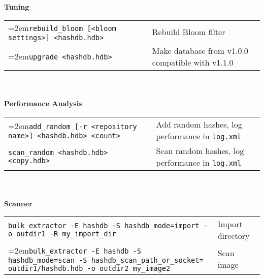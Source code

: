 \begin{small}
\begin{footnotesize}
\begin{tabular}{p{3.6 in} p{3.0 in}}
\end{tabular}
\\
\\
\textbf{Tuning}\\
\begin{tabular}{p{3.6 in} p{3.0 in}}
\hangindent=2em\texttt{rebuild\_bloom [<bloom settings>] <hashdb.hdb>} & Rebuild Bloom filter \\
\hangindent=2em\texttt{upgrade <hashdb.hdb>} & Make database from v1.0.0 compatible with v1.1.0\\
\end{tabular}
\\
\\
\textbf{Performance Analysis}\\
\begin{tabular}{p{3.6 in} p{4 in}}
\hangindent=2em\texttt{add\_random [-r <repository name>] <hashdb.hdb> <count>} & Add random hashes, log performance in \texttt{log.xml}\\
\texttt{scan\_random <hashdb.hdb> <copy.hdb>} & Scan random hashes, log performance in \texttt{log.xml}\\
\end{tabular}
\\
\\
\textbf{\bulk Scanner}\\
\begin{tabular}{p{5.6 in} p{2 in}}
\texttt{bulk\_extractor -E hashdb -S hashdb\_mode=import -o outdir1 -R my\_import\_dir} & Import directory\\
\hangindent=2em\texttt{bulk\_extractor -E hashdb -S hashdb\_mode=scan -S hashdb\_scan\_path\_or\_socket= outdir1/hashdb.hdb -o outdir2 my\_image2} & Scan image\\
\end{tabular}
\end{footnotesize}
\end{small}

